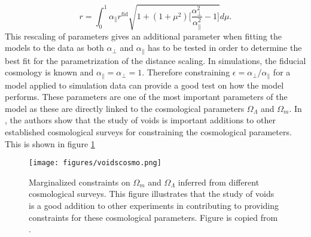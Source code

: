 \begin{equation}\label{eq:r_scaling}
    r=\int_0^1\alpha_\parallel r^{\mathrm{fid}}\sqrt{1+(1+\mu^2)\Big[\frac{\alpha_\perp^2}{\alpha_\parallel^2}-1\Big]}d\mu.
\end{equation}
This rescaling of parameters gives an additional parameter when fitting the models to the data as both $\alpha_\perp$ and $\alpha_\parallel$ has to be tested in order to determine the best fit for the parametrization of the distance scaling. In simulations, the fiducial cosmology is known and $\alpha_\parallel=\alpha_\perp=1$. Therefore constraining $\epsilon=\alpha_\perp/\alpha_\parallel$ for a model applied to simulation data can provide a good test on how the model performs. These parameters are one of the most important parameters of the model as these are directly linked to the cosmological parameters $\Omega_\Lambda$ and $\Omega_m$. In \cite{Nadathur_2020}, the authors show that the study of voids is important additions to other established cosmological surveys for constraining the cosmological parameters. This is shown in figure \ref{fig:voidscosmoparam}
\begin{figure}
    \texttt{[image: figures/voidscosmo.png]}
    \caption{Marginalized constraints on $\Omega_m$ and $\Omega_\Lambda$ inferred from different cosmological surveys. This figure illustrates that the study of voids is a good addition to other experiments in contributing to providing constraints for these cosmological parameters. Figure is copied from \cite{Nadathur_2020}.}
    \label{fig:voidscosmoparam}
\end{figure}
